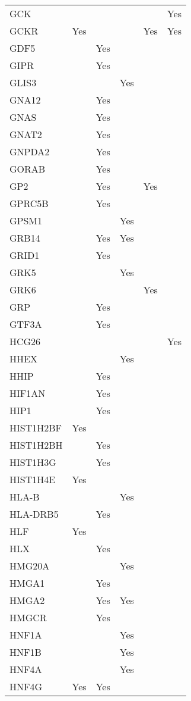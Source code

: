 \documentclass[]{report}
\begin{document}
\begin{longtable}[t]{llllll}
GCK &  &  &  &  & Yes\\
GCKR & Yes &  &  & Yes & Yes\\
GDF5 &  & Yes &  &  & \\
GIPR &  & Yes &  &  & \\
GLIS3 &  &  & Yes &  & \\
GNA12 &  & Yes &  &  & \\
GNAS &  & Yes &  &  & \\
GNAT2 &  & Yes &  &  & \\
GNPDA2 &  & Yes &  &  & \\
GORAB &  & Yes &  &  & \\
GP2 &  & Yes &  & Yes & \\
GPRC5B &  & Yes &  &  & \\
GPSM1 &  &  & Yes &  & \\
GRB14 &  & Yes & Yes &  & \\
GRID1 &  & Yes &  &  & \\
GRK5 &  &  & Yes &  & \\
GRK6 &  &  &  & Yes & \\
GRP &  & Yes &  &  & \\
GTF3A &  & Yes &  &  & \\
HCG26 &  &  &  &  & Yes\\
HHEX &  &  & Yes &  & \\
HHIP &  & Yes &  &  & \\
HIF1AN &  & Yes &  &  & \\
HIP1 &  & Yes &  &  & \\
HIST1H2BF & Yes &  &  &  & \\
HIST1H2BH &  & Yes &  &  & \\
HIST1H3G &  & Yes &  &  & \\
HIST1H4E & Yes &  &  &  & \\
HLA-B &  &  & Yes &  & \\
HLA-DRB5 &  & Yes &  &  & \\
HLF & Yes &  &  &  & \\
HLX &  & Yes &  &  & \\
HMG20A &  &  & Yes &  & \\
HMGA1 &  & Yes &  &  & \\
HMGA2 &  & Yes & Yes &  & \\
HMGCR &  & Yes &  &  & \\
HNF1A &  &  & Yes &  & \\
HNF1B &  &  & Yes &  & \\
HNF4A &  &  & Yes &  & \\
HNF4G & Yes & Yes &  &  & \\

\end{longtable}
\end{document}
